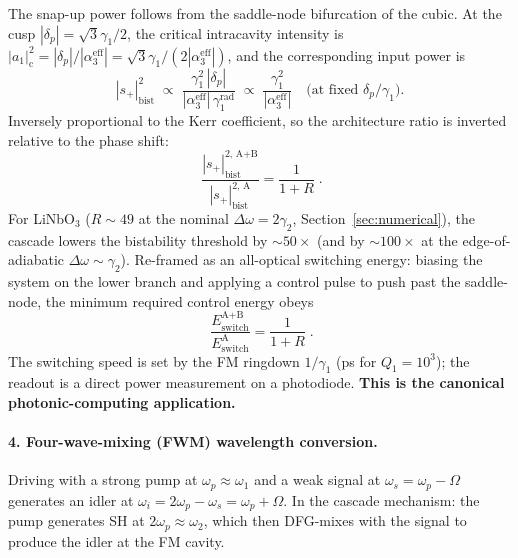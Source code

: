 \documentclass[11pt,a4paper]{article}
\newcommand{\Dom}{\Delta\omega}
\begin{document}
The snap-up power follows from the saddle-node bifurcation of the
cubic.  At the cusp $|\delta_p|=\sqrt{3}\gamma_1/2$, the critical
intracavity intensity is $|a_1|^{2}_\text{c}=|\delta_p|/|\alpha_3^\text{eff}|
=\sqrt{3}\gamma_1/(2|\alpha_3^\text{eff}|)$, and the corresponding
input power is
\begin{equation}
  |s_+|^{2}_\text{bist}\;\propto\;
     \frac{\gamma_1^{2}\,|\delta_p|}{|\alpha_3^\text{eff}|\,\gamma_1^\text{rad}}
     \;\propto\;\frac{\gamma_1^{2}}{|\alpha_3^\text{eff}|}
     \quad\text{(at fixed }\delta_p/\gamma_1\text{).}
  \label{eq:bist-threshold}
\end{equation}
Inversely proportional to the Kerr coefficient, so the architecture
ratio is inverted relative to the phase shift:
\begin{equation}
  \boxed{\;\frac{|s_+|^{2,\,\text{A+B}}_\text{bist}}{|s_+|^{2,\,\text{A}}_\text{bist}}=\frac{1}{1+R}\;.}
  \label{eq:bist-ratio}
\end{equation}
For LiNbO$_3$ ($R\sim 49$ at the nominal $\Dom=2\gamma_2$,
Section~\ref{sec:numerical}), the cascade lowers the bistability
threshold by $\sim\!50\times$ (and by $\sim\!100\times$ at the
edge-of-adiabatic $\Dom\sim\gamma_2$).  Re-framed as an all-optical
switching energy: biasing the system on the lower branch and applying
a control pulse to push past the saddle-node, the minimum required
control energy obeys
\begin{equation}
  \boxed{\;\frac{E_\text{switch}^{\text{A+B}}}{E_\text{switch}^{\text{A}}}=\frac{1}{1+R}\;.}
\end{equation}
The switching speed is set by the FM ringdown $1/\gamma_1$ (ps for
$Q_1=10^{3}$); the readout is a direct power measurement on a
photodiode.  \textbf{This is the canonical photonic-computing
application.}

\paragraph{4. Four-wave-mixing (FWM) wavelength conversion.}
Driving with a strong pump at $\omega_p\approx\omega_1$ and a weak
signal at $\omega_s=\omega_p-\Omega$ generates an idler at
$\omega_i=2\omega_p-\omega_s=\omega_p+\Omega$.  In the cascade
mechanism: the pump generates SH at $2\omega_p\approx\omega_2$, which
then DFG-mixes with the signal to produce the idler at the FM cavity.
\end{document}

